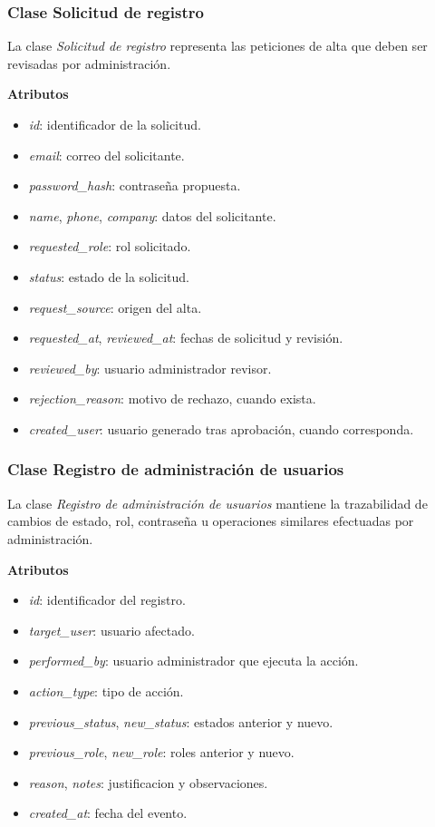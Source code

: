 \subsubsection{Clase Solicitud de registro}

La clase \textit{Solicitud de registro} representa las peticiones de alta que deben ser revisadas por administración.

\textbf{Atributos}

\begin{itemize}
      \item \textit{id}: identificador de la solicitud.
      \item \textit{email}: correo del solicitante.
      \item \textit{password\_hash}: contraseña propuesta.
      \item \textit{name}, \textit{phone}, \textit{company}: datos del solicitante.
      \item \textit{requested\_role}: rol solicitado.
      \item \textit{status}: estado de la solicitud.
      \item \textit{request\_source}: origen del alta.
      \item \textit{requested\_at}, \textit{reviewed\_at}: fechas de solicitud y revisión.
      \item \textit{reviewed\_by}: usuario administrador revisor.
      \item \textit{rejection\_reason}: motivo de rechazo, cuando exista.
      \item \textit{created\_user}: usuario generado tras aprobación, cuando corresponda.
\end{itemize}

\subsubsection{Clase Registro de administración de usuarios}

La clase \textit{Registro de administración de usuarios} mantiene la trazabilidad de cambios de estado, rol, contraseña u operaciones similares efectuadas por administración.

\textbf{Atributos}

\begin{itemize}
      \item \textit{id}: identificador del registro.
      \item \textit{target\_user}: usuario afectado.
      \item \textit{performed\_by}: usuario administrador que ejecuta la acción.
      \item \textit{action\_type}: tipo de acción.
      \item \textit{previous\_status}, \textit{new\_status}: estados anterior y nuevo.
      \item \textit{previous\_role}, \textit{new\_role}: roles anterior y nuevo.
      \item \textit{reason}, \textit{notes}: justificacion y observaciones.
      \item \textit{created\_at}: fecha del evento.
\end{itemize}

